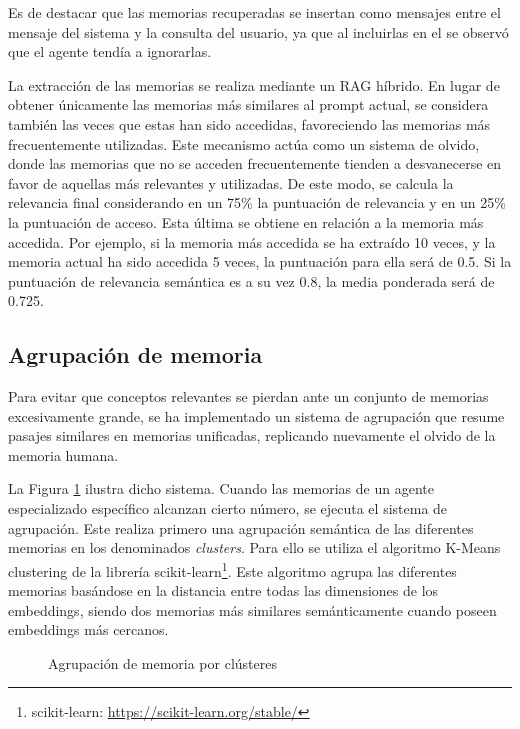 Es de destacar que las memorias recuperadas se insertan como mensajes  entre el mensaje del sistema y la consulta del usuario, ya que al incluirlas en el  se observó que el agente tendía a ignorarlas.

La extracción de las memorias se realiza mediante un RAG híbrido. En lugar de obtener únicamente las memorias más similares al prompt actual, se considera también las veces que estas han sido accedidas, favoreciendo las memorias más frecuentemente utilizadas. Este mecanismo actúa como un sistema de olvido, donde las memorias que no se acceden frecuentemente tienden a desvanecerse en favor de aquellas más relevantes y utilizadas. De este modo, se calcula la relevancia final considerando en un 75\% la puntuación de relevancia y en un 25\% la puntuación de acceso. Esta última se obtiene en relación a la memoria más accedida. Por ejemplo, si la memoria más accedida se ha extraído 10 veces, y la memoria actual ha sido accedida 5 veces, la puntuación para ella será de 0.5. Si la puntuación de relevancia semántica es a su vez 0.8, la media ponderada será de 0.725.

\subsection{Agrupación de memoria}
Para evitar que conceptos relevantes se pierdan ante un conjunto de memorias excesivamente grande, se ha implementado un sistema de agrupación que resume pasajes similares en memorias unificadas, replicando nuevamente el olvido de la memoria humana.

La Figura \ref{fig:mem_2} ilustra dicho sistema. Cuando las memorias de un agente especializado específico alcanzan cierto número, se ejecuta el sistema de agrupación. Este realiza primero una agrupación semántica de las diferentes memorias en los denominados \textit{clusters}. Para ello se utiliza el algoritmo K-Means clustering de la librería scikit-learn\footnote{scikit-learn: \url{https://scikit-learn.org/stable/}}. Este algoritmo agrupa las diferentes memorias basándose en la distancia entre todas las dimensiones de los embeddings, siendo dos memorias más similares semánticamente cuando poseen embeddings más cercanos.

\begin{figure}[h]
\centering
{}
\caption{Agrupación de memoria por clústeres}
\label{fig:mem_2}
\end{figure}

